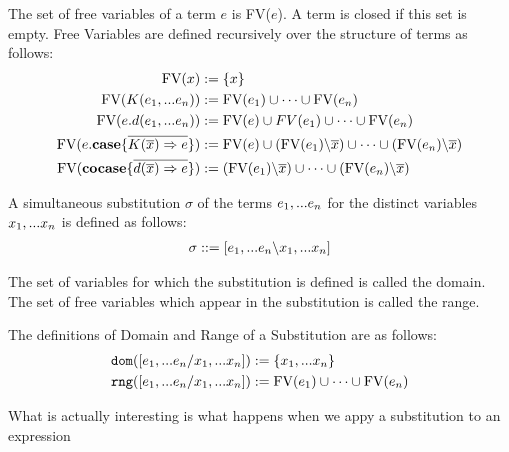 \documentclass[twoside,12pt,a4paper]{article}
\begin{document}
\begin{definition}
    The set of free variables of a term $e$ is FV($e$). A term is closed if this set is empty.
    Free Variables are defined recursively over the structure of terms as follows:
    \begin{align*}
        \begin{split}
            \text{FV}(x) &:= \{x\}\\
            \text{FV}(K(e_1,...e_n)) &:= \text{FV}(e_1) \cup \dots\cup \text{FV}(e_n)\\
            \text{FV}(e.d(e_1,...e_n)) &:= \text{FV}(e)\cup FV(e_1) \cup \dots \cup \text{FV}(e_n)\\
            \text{FV}(e.\textbf{case}\{\overline{K(\overline{x})\Rightarrow e}\}) &:= \text{FV}(e)\cup (\text{FV}(e_1)\backslash\overline{x})\cup \dots\cup (\text{FV}(e_n)\backslash\overline{x})\\
            \text{FV}(\textbf{cocase}\{\overline{d(\overline{x})\Rightarrow e}\}) &:= (\text{FV}(e_1)\backslash\overline{x})\cup \dots\cup (\text{FV}(e_n)\backslash\overline{x})
        \end{split}
    \end{align*}
\end{definition}


\begin{definition}[Substitution]
    A simultaneous substitution $\sigma$ of the terms $e_1,...e_n$ for the distinct variables $x_1,...x_n$ is defined as follows:
    \begin{align*} %
        \sigma ::= [\listofexpr \backslash\listofvar]
    \end{align*}
\end{definition}

The set of variables for which the substitution is defined is called the domain.
The set of free variables which appear in the substitution is called the range. %

\begin{definition}
    The definitions of Domain and Range of a Substitution are as follows:
    \begin{align*}
        \texttt{dom}([e_1,...e_n/x_1,...x_n]) &:= \{x_1,...x_n\}\\
        \texttt{rng}([e_1,...e_n/x_1,...x_n]) &:= \text{FV}(e_1)\cup \dots\cup\text{FV}(e_n)
    \end{align*}
\end{definition}

What is actually interesting is what happens when we appy a substitution to an expression
\end{document}
